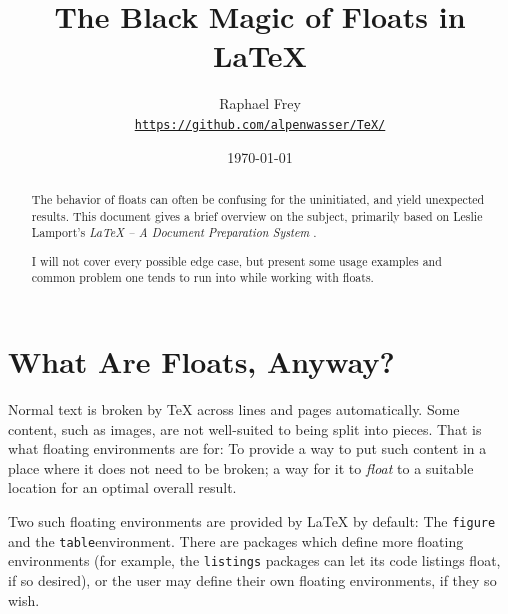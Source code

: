 \documentclass[article,a4paper,oneside,10pt]{memoir}
\title{\textsf{\Huge  The Black Magic of Floats in \LaTeX}}
\author{Raphael Frey\\[2mm]\small%
    \href{https://github.com/alpenwasser/TeX/tree/master/floats}
         {\nolinkurl{https://github.com/alpenwasser/TeX/}}}
\date{\vspace{1em}\today}
\begin{document}


\maketitle

\begin{abstract}
    The behavior  of floats can  often be  confusing for the  uninitiated, and
    yield  unexpected results. This  document gives  a brief  overview on  the
    subject, primarily based on Leslie  Lamport's \emph{\LaTeX{} -- A Document
    Preparation System} \cite{lamport}.

    I will not cover every possible edge case, but present some usage examples
    and common problem one tends to run into while working with floats.
\end{abstract}

\tableofcontents*
\listoflistings*
\listoffigures*
\listoftables*


\newpage
\chapter{What Are Floats, Anyway?}
\label{chap:what-are-floats}

Normal text  is broken  by \TeX{} across  lines and  pages automatically. Some
content, such as images, are not  well-suited to being split into pieces. That
is what floating environments are for: To provide a way to put such content in
a place where it does not need to be broken; a way for it to \emph{float} to a
suitable location for an optimal overall result.

Two  such  floating environments  are  provided  by \LaTeX{}  by  default: The
\verb|figure|   and  the   \verb|table|\footnotemark  environment. There   are
packages   which  define   more  floating   environments  (for   example,  the
\verb|listings| packages can  let its code listings float, if  so desired), or
the user may define their own floating environments, if they so wish.

\end{document}

